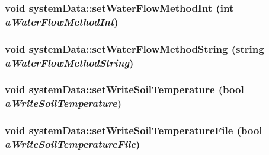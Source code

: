 \label{classsystem_data_a3426eaf406fa4f132ff4e7ba1a8296c6}
\hypertarget{classsystem_data_abb08133e6260060d6bb8c64581c5d813}{
\subsubsection[{setWaterFlowMethodInt}]{\setlength{\rightskip}{0pt plus 5cm}void systemData::setWaterFlowMethodInt (int {\em aWaterFlowMethodInt})}}
\label{classsystem_data_abb08133e6260060d6bb8c64581c5d813}
\hypertarget{classsystem_data_a95e67381901e78667cfcfe510d1c4eb7}{
\subsubsection[{setWaterFlowMethodString}]{\setlength{\rightskip}{0pt plus 5cm}void systemData::setWaterFlowMethodString (string {\em aWaterFlowMethodString})}}
\label{classsystem_data_a95e67381901e78667cfcfe510d1c4eb7}
\hypertarget{classsystem_data_a5c262bbd51cda692ed4a2592127e5f7e}{
\subsubsection[{setWriteSoilTemperature}]{\setlength{\rightskip}{0pt plus 5cm}void systemData::setWriteSoilTemperature (bool {\em aWriteSoilTemperature})}}
\label{classsystem_data_a5c262bbd51cda692ed4a2592127e5f7e}
\hypertarget{classsystem_data_a1d96b07171117ad17648b6e2040a33d9}{
\subsubsection[{setWriteSoilTemperatureFile}]{\setlength{\rightskip}{0pt plus 5cm}void systemData::setWriteSoilTemperatureFile (bool {\em aWriteSoilTemperatureFile})}}
\label{classsystem_data_a1d96b07171117ad17648b6e2040a33d9}


